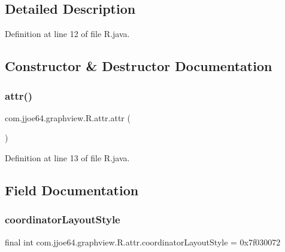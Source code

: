\subsection{Detailed Description}


Definition at line 12 of file R.\+java.



\subsection{Constructor \& Destructor Documentation}
\mbox{\label{classcom_1_1jjoe64_1_1graphview_1_1_r_1_1attr_a646ba5ebaec816238ec3e4a3ad0d5a93}} 
\subsubsection{\texorpdfstring{attr()}{attr()}}
{\footnotesize\ttfamily com.\+jjoe64.\+graphview.\+R.\+attr.\+attr (\begin{DoxyParamCaption}{ }\end{DoxyParamCaption})\hspace{0.3cm}{\ttfamily [private]}}



Definition at line 13 of file R.\+java.


\begin{DoxyCode}{0}

\end{DoxyCode}


\subsection{Field Documentation}
\mbox{\label{classcom_1_1jjoe64_1_1graphview_1_1_r_1_1attr_a031268af1f64363f6fe3a91f44f0bd60}} 
\subsubsection{\texorpdfstring{coordinatorLayoutStyle}{coordinatorLayoutStyle}}
{\footnotesize\ttfamily final int com.\+jjoe64.\+graphview.\+R.\+attr.\+coordinator\+Layout\+Style = 0x7f030072\hspace{0.3cm}{\ttfamily [static]}}



